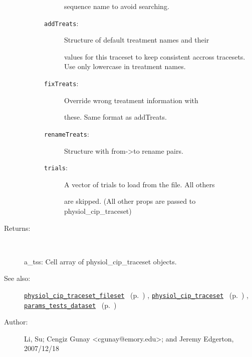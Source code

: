 \begin{description}
\begin{description}
\begin{description}
sequence name to avoid searching.
\item[\texttt{addTreats}:]
 Structure of default treatment names and their

values for this traceset to keep consistent accross 
tracesets. Use only lowercase in treatment names.
\item[\texttt{fixTreats}:]
 Override wrong treatment information with

these. Same format as addTreats.
\item[\texttt{renameTreats}:]
 Structure with from->to rename pairs.
\item[\texttt{trials}:]
 A vector of trials to load from the file. All others

are skipped.
(All other props are passed to physiol\_cip\_traceset)
\end{description}%
\end{description}%
%
\item[Returns:
]~

	a\_tss: Cell array of physiol\_cip\_traceset objects.
%
%
\item[See also:]%
\hyperlink{ref_physiol_cip_traceset_fileset}{\texttt{physiol\_cip\_traceset\_fileset}}%
\ (p.~\pageref{ref_physiol_cip_traceset_fileset})%
%
, \hyperlink{ref_physiol_cip_traceset}{\texttt{physiol\_cip\_traceset}}%
\ (p.~\pageref{ref_physiol_cip_traceset})%
%
, \hyperlink{ref_params_tests_dataset}{\texttt{params\_tests\_dataset}}%
\ (p.~\pageref{ref_params_tests_dataset})%
%
%
\item[Author:]%
Li, Su; Cengiz Gunay <cgunay@emory.edu>; and Jeremy Edgerton, 2007/12/18
%
\end{description}
\methodline%
